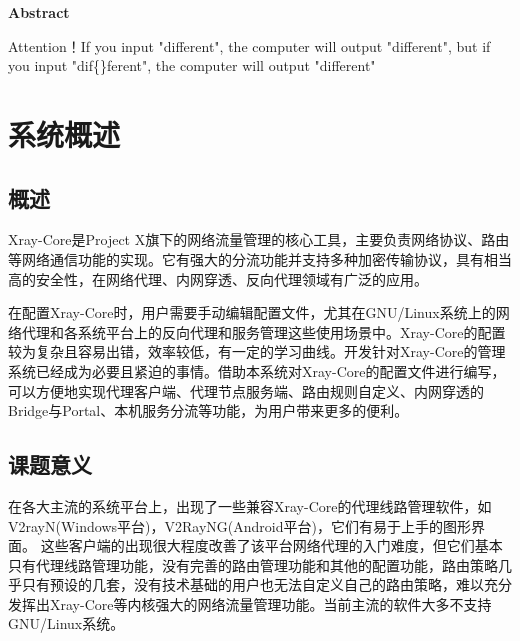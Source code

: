 \documentclass[12pt,a4paper]{article}%
\begin{document}
\begin{center}%
	{\textbf{Abstract}}%
\end{center}
\begin{adjustwidth}{1.06cm}{1.06cm}%
	\hspace{1.5em}Attention！If you input "dif{}ferent", the computer will output "different", but if you input "dif\{\}ferent", the computer will output "dif{}ferent"
\end{adjustwidth}

\newpage%

\tableofcontents
\newpage

\fancyfoot[C]{\thepage} %
\setcounter{page}{1} %

\section{系统概述}
\subsection{概述}

Xray-Core是Project X旗下的网络流量管理的核心工具，主要负责网络协议、路由等网络通信功能的实现。它有强大的分流功能并支持多种加密传输协议，具有相当高的安全性，在网络代理、内网穿透、反向代理领域有广泛的应用。

在配置Xray-Core时，用户需要手动编辑配置文件，尤其在GNU/Linux系统上的网络代理和各系统平台上的反向代理和服务管理这些使用场景中。Xray-Core的配置较为复杂且容易出错，效率较低，有一定的学习曲线。开发针对Xray-Core的管理系统已经成为必要且紧迫的事情。借助本系统对Xray-Core的配置文件进行编写，可以方便地实现代理客户端、代理节点服务端、路由规则自定义、内网穿透的Bridge与Portal、本机服务分流等功能，为用户带来更多的便利。

\subsection{课题意义}
在各大主流的系统平台上，出现了一些兼容Xray-Core的代理线路管理软件，如V2rayN(Windows平台)，V2RayNG(Android平台)，它们有易于上手的图形界面。 这些客户端的出现很大程度改善了该平台网络代理的入门难度，但它们基本只有代理线路管理功能，没有完善的路由管理功能和其他的配置功能，路由策略几乎只有预设的几套，没有技术基础的用户也无法自定义自己的路由策略，难以充分发挥出Xray-Core等内核强大的网络流量管理功能。当前主流的软件大多不支持GNU/Linux系统。
\end{document}
